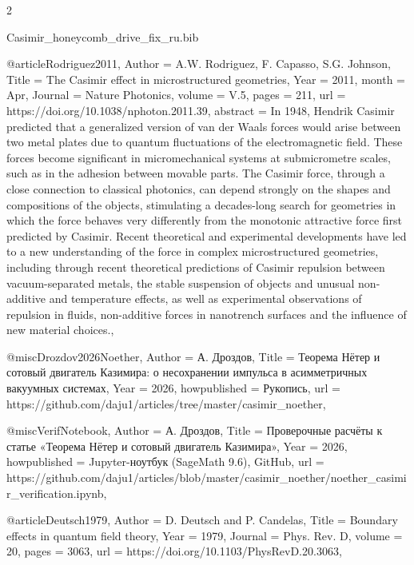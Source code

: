 \documentclass[twoside, 10pt]{article}
\def\myfilename{Casimir_honeycomb_drive_fix_ru}
\begin{document}
\begin{multicols}{2}
\begin{filecontents}{\myfilename.bib}


@article{Rodriguez2011,
    Author = {A.W. Rodriguez, F. Capasso, S.G. Johnson},
    Title = {The Casimir effect in microstructured geometries},
    Year = {2011},
    month = {Apr},
    Journal = {Nature Photonics},
    volume = {V.5},
    pages = {211},
    url = {https://doi.org/10.1038/nphoton.2011.39},
    abstract = {In 1948, Hendrik Casimir predicted that a generalized version of van der Waals forces would arise between two metal plates due to quantum fluctuations of the electromagnetic field. These forces become significant in micromechanical systems at submicrometre scales, such as in the adhesion between movable parts. The Casimir force, through a close connection to classical photonics, can depend strongly on the shapes and compositions of the objects, stimulating a decades-long search for geometries in which the force behaves very differently from the monotonic attractive force first predicted by Casimir. Recent theoretical and experimental developments have led to a new understanding of the force in complex microstructured geometries, including through recent theoretical predictions of Casimir repulsion between vacuum-separated metals, the stable suspension of objects and unusual non-additive and temperature effects, as well as experimental observations of repulsion in fluids, non-additive forces in nanotrench surfaces and the influence of new material choices.},
}

@misc{Drozdov2026Noether,
    Author = {А. Дроздов},
    Title = {Теорема Нётер и сотовый двигатель Казимира: о несохранении импульса в асимметричных вакуумных системах},
    Year = {2026},
    howpublished = {Рукопись},
    url = {https://github.com/daju1/articles/tree/master/casimir_noether},
}

@misc{VerifNotebook,
    Author = {А. Дроздов},
    Title = {Проверочные расчёты к статье «Теорема Нётер и сотовый двигатель Казимира»},
    Year = {2026},
    howpublished = {Jupyter-ноутбук (SageMath 9.6), GitHub},
    url = {https://github.com/daju1/articles/blob/master/casimir_noether/noether_casimir_verification.ipynb},
}

@article{Deutsch1979,
    Author = {D. Deutsch and P. Candelas},
    Title = {Boundary effects in quantum field theory},
    Year = {1979},
    Journal = {Phys. Rev. D},
    volume = {20},
    pages = {3063},
    url = {https://doi.org/10.1103/PhysRevD.20.3063},
}


\end{filecontents}
\end{multicols}
\end{document}
